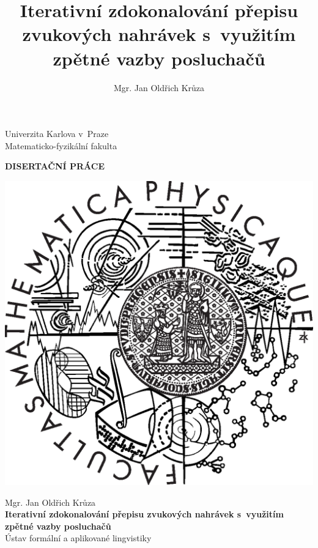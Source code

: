 \documentclass[12pt,notitlepage]{report}
\title{Iterativní zdokonalování přepisu zvukových nahrávek s~využitím zpětné vazby posluchačů}   %
\author{Mgr. Jan Oldřich Krůza} %
\begin{document}


\begin{titlepage}
\begin{center}

\vspace{15mm}

\large
Univerzita Karlova v~Praze\\
Matematicko-fyzikální fakulta\\

\vspace{5mm}

{\Large\bf DISERTAČNÍ PRÁCE}

\vspace{25mm}

\includegraphics[scale=0.5]{rc/mff-logo.eps} 

\vspace{25mm}


Mgr. Jan Oldřich Krůza\\
\vspace{5mm}
{\Large\bf Iterativní zdokonalování přepisu zvukových nahrávek s~využitím zpětné vazby posluchačů}\\
\vspace{5mm}
Ústav formální a aplikované lingvistiky\\
\end{center}
\vspace{10mm}


\end{titlepage}
\end{document}
